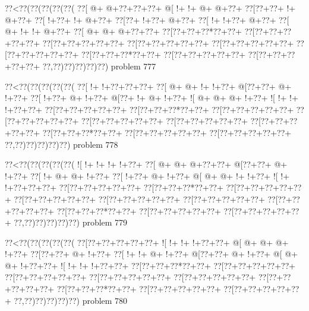 \vbox{\vbox{\goo
\0??<\0??(\0??(\0??(\0??(\0??(
\0??[\- @+\- @+\0??+\0??+\0??+
\- @[\- !+\- !+\- @+\- @+\0??+
\0??[\0??+\0??+\- !+\- @+\0??+
\0??[\- !+\0??+\- !+\- @+\0??+
\0??[\0??+\- !+\0??+\- @+\0??+
\0??[\- !+\- !+\0??+\- @+\0??+
\0??[\- @+\- !+\- !+\- @+\0??+
\0??[\- @+\- @+\- @+\0??+\0??+
\0??[\0??+\0??+\0??*\0??+\0??+
\0??[\0??+\0??+\0??+\0??+\0??+
\0??[\0??+\0??+\0??+\0??+\0??+
\0??[\0??+\0??+\0??+\0??+\0??+
\0??[\0??+\0??+\0??+\0??+\0??+
\0??[\0??+\0??+\0??+\0??+\0??+
\0??[\0??+\0??+\0??*\0??+\0??+
\0??[\0??+\0??+\0??+\0??+\0??+
\0??[\0??+\0??+\0??+\0??+\0??+
\0??,\0??)\0??)\0??)\0??)\0??)
}
\hfil problem 777\hfil\break
}

\vbox{\vbox{\goo
\0??<\0??(\0??(\0??(\0??(\0??(
\0??[\- !+\- !+\0??+\0??+\0??+
\0??[\- @+\- @+\- !+\- !+\0??+
\- @[\0??+\0??+\- @+\- !+\0??+
\0??[\- !+\0??+\- @+\- !+\0??+
\- @[\0??+\- !+\- @+\- !+\0??+
\- ![\- @+\- @+\- @+\- !+\0??+
\- ![\- !+\- !+\- !+\0??+\0??+
\0??[\0??+\0??+\0??+\0??+\0??+
\0??[\0??+\0??+\0??*\0??+\0??+
\0??[\0??+\0??+\0??+\0??+\0??+
\0??[\0??+\0??+\0??+\0??+\0??+
\0??[\0??+\0??+\0??+\0??+\0??+
\0??[\0??+\0??+\0??+\0??+\0??+
\0??[\0??+\0??+\0??+\0??+\0??+
\0??[\0??+\0??+\0??*\0??+\0??+
\0??[\0??+\0??+\0??+\0??+\0??+
\0??[\0??+\0??+\0??+\0??+\0??+
\0??,\0??)\0??)\0??)\0??)\0??)
}
\hfil problem 778\hfil\break
}

\vbox{\vbox{\goo
\0??<\0??(\0??(\0??(\0??(\0??(
\- ![\- !+\- !+\- !+\- !+\0??+
\0??[\- @+\- @+\- @+\0??+\0??+
\- @[\0??+\0??+\- @+\- !+\0??+
\0??[\- !+\- @+\- @+\- !+\0??+
\0??[\- !+\0??+\- @+\- !+\0??+
\- @[\- @+\- @+\- !+\- !+\0??+
\- ![\- !+\- !+\0??+\0??+\0??+
\0??[\0??+\0??+\0??+\0??+\0??+
\0??[\0??+\0??+\0??*\0??+\0??+
\0??[\0??+\0??+\0??+\0??+\0??+
\0??[\0??+\0??+\0??+\0??+\0??+
\0??[\0??+\0??+\0??+\0??+\0??+
\0??[\0??+\0??+\0??+\0??+\0??+
\0??[\0??+\0??+\0??+\0??+\0??+
\0??[\0??+\0??+\0??*\0??+\0??+
\0??[\0??+\0??+\0??+\0??+\0??+
\0??[\0??+\0??+\0??+\0??+\0??+
\0??,\0??)\0??)\0??)\0??)\0??)
}
\hfil problem 779\hfil\break
}

\vbox{\vbox{\goo
\0??<\0??(\0??(\0??(\0??(\0??(
\0??[\0??+\0??+\0??+\0??+\0??+
\- ![\- !+\- !+\- !+\0??+\0??+
\- @[\- @+\- @+\- @+\- !+\0??+
\0??[\0??+\0??+\- @+\- !+\0??+
\0??[\- !+\- !+\- @+\- !+\0??+
\- @[\0??+\0??+\- @+\- !+\0??+
\- @[\- @+\- @+\- !+\0??+\0??+
\- ![\- !+\- !+\- !+\0??+\0??+
\0??[\0??+\0??+\0??*\0??+\0??+
\0??[\0??+\0??+\0??+\0??+\0??+
\0??[\0??+\0??+\0??+\0??+\0??+
\0??[\0??+\0??+\0??+\0??+\0??+
\0??[\0??+\0??+\0??+\0??+\0??+
\0??[\0??+\0??+\0??+\0??+\0??+
\0??[\0??+\0??+\0??*\0??+\0??+
\0??[\0??+\0??+\0??+\0??+\0??+
\0??[\0??+\0??+\0??+\0??+\0??+
\0??,\0??)\0??)\0??)\0??)\0??)
}
\hfil problem 780\hfil\break
}

